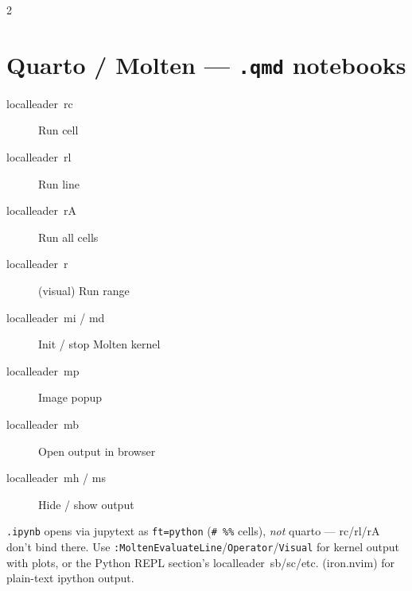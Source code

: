 \documentclass[14pt]{extarticle}
\newcommand{\key}[1]{\colorbox{keybg}{\ttfamily\small\mbox{#1}}}
\begin{document}
\begin{multicols}{2}
\section{Quarto / Molten --- \texttt{.qmd} notebooks}
\begin{description}
  \item[\key{localleader rc}] Run cell
  \item[\key{localleader rl}] Run line
  \item[\key{localleader rA}] Run all cells
  \item[\key{localleader r}] (visual) Run range
  \item[\key{localleader mi} / \key{md}] Init / stop Molten kernel
  \item[\key{localleader mp}] Image popup
  \item[\key{localleader mb}] Open output in browser
  \item[\key{localleader mh} / \key{ms}] Hide / show output
\end{description}
{\small\color{note} \texttt{.ipynb} opens via jupytext as \texttt{ft=python} (\texttt{\# \%\%} cells), \emph{not} quarto --- rc/rl/rA don't bind there. Use \texttt{:MoltenEvaluateLine}/\texttt{Operator}/\texttt{Visual} for kernel output with plots, or the Python REPL section's \key{localleader sb}/\key{sc}/etc. (iron.nvim) for plain-text ipython output.}

\end{multicols}
\end{document}
